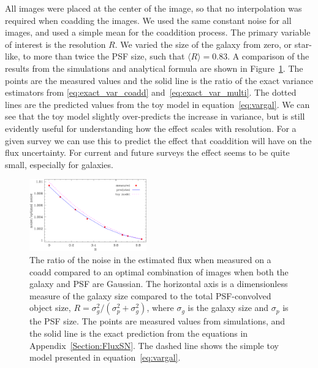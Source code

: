 \documentclass[fleqn,useAMS,usenatbib]{mnras}
\begin{document}
All images were placed at the center of the image, so that no interpolation was 
required when coadding the images.  We used the same constant noise for all 
images, and used a simple mean for the coaddition process.  The primary 
variable of interest is the resolution $R$.  We varied the size of the galaxy 
from zero, or star-like, to more than twice the PSF size, such that $\langle R\rangle = 
0.83$.  A comparison of the results from the simulations and analytical formula 
are shown in Figure~\ref{fig:mcresults}.  The points are the measured values 
and the solid line is the ratio of the exact variance estimators from 
\eqref{eq:exact_var_coadd} and~\eqref{eq:exact_var_multi}.  The dotted lines are the 
predicted values from the toy model in equation~\eqref{eq:vargal}.  We can 
see that the toy model slightly over-predicts the increase in variance, but is 
still evidently useful for understanding how the effect scales with resolution. 
For a given survey we can use this to predict the effect that coaddition will 
have on the flux uncertainty.  For current and future surveys the effect seems 
to be quite small, especially for galaxies.

\begin{figure}
\includegraphics[width=0.45\textwidth]{toy-model.pdf}
\caption{The ratio of the noise in the estimated flux when measured on a coadd 
compared to an optimal combination of images when both the galaxy and PSF are Gaussian.
The horizontal axis is a dimensionless measure of the galaxy size compared to the total
PSF-convolved object size, $R=\sigma_g^2/(\sigma_p^2 +
\sigma_g^2)$, 
where $\sigma_g$ is the galaxy size and $\sigma_p$ is the PSF size.
The points are measured values from simulations, and the solid line is the exact 
prediction from the equations in Appendix~\ref{Section:FluxSN}.  The dashed line shows 
the simple toy model presented in equation~\eqref{eq:vargal}. \label{fig:mcresults}}
\end{figure}
\end{document}
